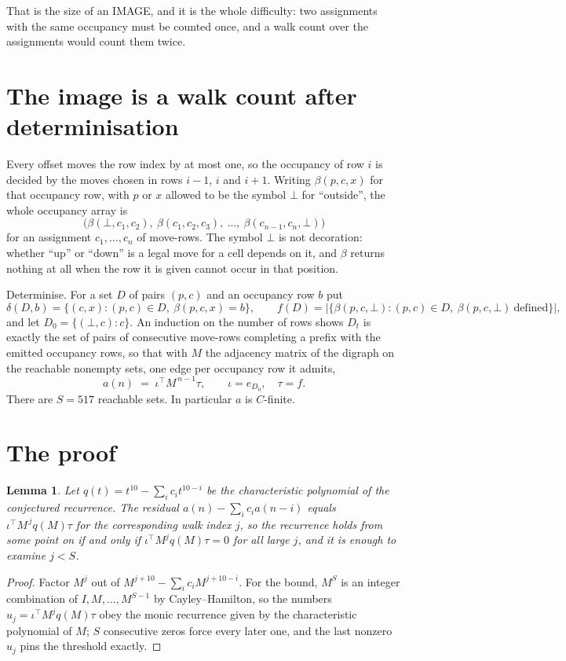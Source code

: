\documentclass[11pt,a4paper]{article}
\theoremstyle{plain}
\newtheorem{lemma}[theorem]{Lemma}
\theoremstyle{definition}
\begin{document}
That is the size of an IMAGE, and it is the whole difficulty: two assignments with the same
occupancy must be counted once, and a walk count over the assignments would count them twice.

\section{The image is a walk count after determinisation}

Every offset moves the row index by at most one, so the occupancy of row $i$ is decided by the
moves chosen in rows $i-1$, $i$ and $i+1$. Writing $\beta(p,c,x)$ for that occupancy row, with
$p$ or $x$ allowed to be the symbol $\bot$ for ``outside'', the whole occupancy array is
\[
\bigl(\beta(\bot,c_1,c_2),\ \beta(c_1,c_2,c_3),\ \dots,\ \beta(c_{n-1},c_n,\bot)\bigr)
\]
for an assignment $c_1,\dots,c_n$ of move-rows. The symbol $\bot$ is not decoration: whether
``up'' or ``down'' is a legal move for a cell depends on it, and $\beta$ returns nothing at all
when the row it is given cannot occur in that position.

Determinise. For a set $D$ of pairs $(p,c)$ and an occupancy row $b$ put
\[
\delta(D,b)=\{(c,x):(p,c)\in D,\ \beta(p,c,x)=b\},\qquad
f(D)=\bigl|\{\beta(p,c,\bot):(p,c)\in D,\ \beta(p,c,\bot)\ \text{defined}\}\bigr| ,
\]
and let $D_0=\{(\bot,c):c\}$. An induction on the number of rows shows $D_t$ is exactly the
set of pairs of consecutive move-rows completing a prefix with the emitted occupancy rows, so
that with $M$ the adjacency matrix of the digraph on the reachable nonempty sets, one edge per
occupancy row it admits,
\[
a(n)\;=\;\iota^{\!\top}M^{\,n-1}\tau,\qquad \iota=e_{D_0},\quad \tau=f .
\]
There are $S=517$ reachable sets. In particular $a$ is $C$-finite.

\section{The proof}

\begin{lemma}\label{lem:crit}
Let $q(t)=t^{10}-\sum_i c_it^{10-i}$ be the characteristic polynomial of the
conjectured recurrence. The residual $a(n)-\sum_ic_ia(n-i)$ equals
$\iota^{\!\top}M^{\,j}q(M)\tau$ for the corresponding walk index $j$, so the recurrence
holds from some point on if and only if $\iota^{\!\top}M^{j}q(M)\tau=0$ for all large $j$,
and it is enough to examine $j<S$.
\end{lemma}

\begin{proof}
Factor $M^{j}$ out of $M^{j+10}-\sum_ic_iM^{j+10-i}$. For the bound, $M^{S}$
is an integer combination of $I,M,\dots,M^{S-1}$ by Cayley--Hamilton, so the numbers
$u_j=\iota^{\!\top}M^{j}q(M)\tau$ obey the monic recurrence given by the characteristic
polynomial of $M$; $S$ consecutive zeros force every later one, and the last nonzero $u_j$
pins the threshold exactly.
\end{proof}
\end{document}
